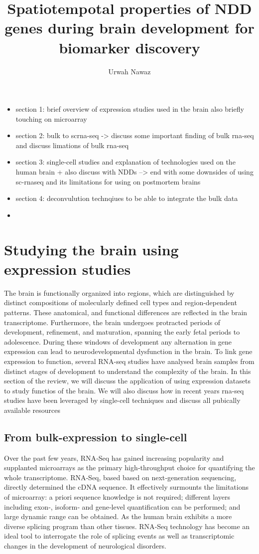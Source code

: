 \documentclass[12pt]{article}
\title{Spatiotempotal properties of NDD genes during brain development for biomarker discovery}
\author{Urwah Nawaz}
\begin{document}
	\maketitle


\begin{itemize}
	\item section 1: brief overview of expression studies used in the brain also briefly touching on microarray 
	\item section 2: bulk to scrna-seq -> discuss some important finding of bulk rna-seq and discuss limations of bulk rna-seq
	\item section 3: single-cell studies and explanation of technologies used on the human brain + also discuss with NDDs --> end with some downsides of using sc-rnaseq and its limitations for using on postmortem brains
	\item section 4: deconvulution technqiues to be able to integrate the bulk data 
	\item 
\end{itemize}
\section{Studying the brain using expression studies}
The brain is functionally organized into regions, which are distinguished by distinct compositions of molecularly defined cell types and region-dependent patterns. These anatomical, and functional differences are reflected in the brain transcriptome. 
Furthermore, the brain undergoes protracted periods of development, refinement, and maturation, spanning the early fetal periods to adolescence.
During these windows of development any alternation in gene expression can lead to neurodevelopmental dysfunction in the brain. 
To link gene expression to function, several RNA-seq studies have analysed brain samples from distinct stages of development to understand the complexity of the brain. In this section of the review, we will discuss the application of using expression datasets to study functios of the brain. 
We will also discuss how in recent years rna-seq studies have been leveraged by single-cell techniques and discuss all pubically available resources

\subsection{From bulk-expression to single-cell}
Over the past few years, RNA‐Seq has gained increasing popularity and supplanted microarrays as the primary high‐throughput choice for quantifying the whole transcriptome.
RNA‐Seq, based based on next‐generation sequencing, directly determined the cDNA sequence. It effectively surmounts the limitations of microarray: a priori sequence knowledge is not required; different layers including exon‐, isoform‐ and gene‐level quantification can be performed; and large dynamic range can be obtained. As the human brain exhibits a more diverse splicing program than other tissues.  RNA‐Seq technology has become an ideal tool to interrogate the role of splicing events as well as transcriptomic changes in the development of neurological disorders.
\end{document}
